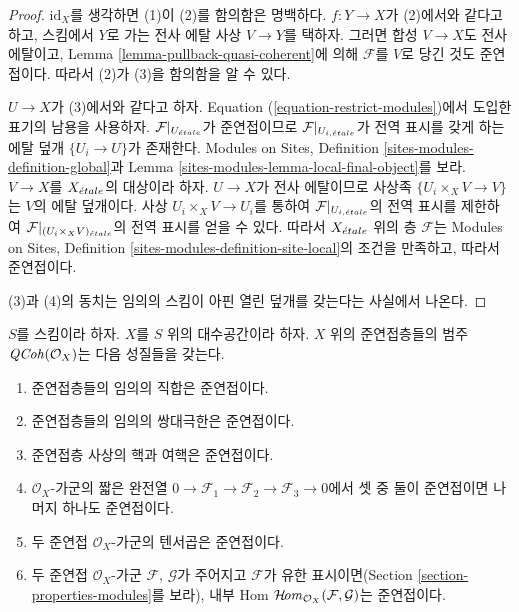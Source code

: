 \begin{proof}
$\text{id}_X$를 생각하면 (1)이 (2)를 함의함은 명백하다.
$f : Y \to X$가 (2)에서와 같다고 하고, 스킴에서 $Y$로 가는 전사
에탈 사상 $V \to Y$를 택하자. 그러면 합성 $V \to X$도 전사
에탈이고, Lemma \ref{lemma-pullback-quasi-coherent}에 의해
$\mathcal{F}$를 $V$로 당긴 것도 준연접이다. 따라서 (2)가 (3)을
함의함을 알 수 있다.

\medskip\noindent
$U \to X$가 (3)에서와 같다고 하자. Equation
(\ref{equation-restrict-modules})에서 도입한 표기의 남용을 사용하자.
$\mathcal{F}|_{U_{\acute{e}tale}}$가 준연접이므로
$\mathcal{F}|_{U_{i, {\acute{e}tale}}}$가 전역 표시를 갖게 하는 에탈 덮개
$\{U_i \to U\}$가 존재한다. Modules on Sites, Definition
\ref{sites-modules-definition-global}과 Lemma
\ref{sites-modules-lemma-local-final-object}를 보라.
$V \to X$를 $X_{\acute{e}tale}$의 대상이라 하자. $U \to X$가 전사 에탈이므로
사상족 $\{U_i \times_X V \to V\}$는 $V$의 에탈 덮개이다.
사상 $U_i \times_X V \to U_i$를 통하여
$\mathcal{F}|_{U_{i, {\acute{e}tale}}}$의 전역 표시를 제한하여
$\mathcal{F}|_{(U_i \times_X V)_{\acute{e}tale}}$의 전역 표시를 얻을 수 있다.
따라서 $X_{\acute{e}tale}$ 위의 층 $\mathcal{F}$는 Modules on Sites, Definition
\ref{sites-modules-definition-site-local}의 조건을 만족하고, 따라서
준연접이다.

\medskip\noindent
(3)과 (4)의 동치는 임의의 스킴이 아핀 열린 덮개를 갖는다는 사실에서
나온다.
\end{proof}

\begin{lemma}
\label{lemma-properties-quasi-coherent}
$S$를 스킴이라 하자. $X$를 $S$ 위의 대수공간이라 하자.
$X$ 위의 준연접층들의 범주 $\mathit{QCoh}(\mathcal{O}_X)$는 다음 성질들을
갖는다.
\begin{enumerate}
\item 준연접층들의 임의의 직합은 준연접이다.
\item 준연접층들의 임의의 쌍대극한은 준연접이다.
\item 준연접층 사상의 핵과 여핵은 준연접이다.
\item $\mathcal{O}_X$-가군의 짧은 완전열
$0 \to \mathcal{F}_1 \to \mathcal{F}_2 \to \mathcal{F}_3 \to 0$에서
셋 중 둘이 준연접이면 나머지 하나도 준연접이다.
\item 두 준연접 $\mathcal{O}_X$-가군의 텐서곱은 준연접이다.
\item 두 준연접 $\mathcal{O}_X$-가군 $\mathcal{F}$, $\mathcal{G}$가
주어지고 $\mathcal{F}$가 유한 표시이면(Section
\ref{section-properties-modules}를 보라), 내부 Hom
$\mathop{\mathcal{H}\!\mathit{om}}\nolimits_{\mathcal{O}_X}(\mathcal{F}, \mathcal{G})$는 준연접이다.
\end{enumerate}
\end{lemma}

